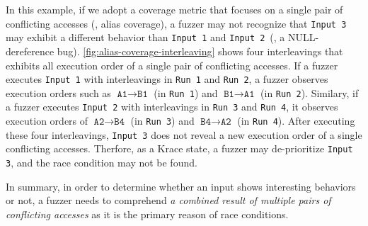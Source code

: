 In this example, if we adopt a coverage metric that focuses on a
single pair of conflicting accesses (\eg, alias coverage), a fuzzer
may not recognize that \texttt{Input 3} may exhibit a different
behavior than \texttt{Input 1} and \texttt{Input 2}~(\ie, a
NULL-dereference bug).
%
\autoref{fig:alias-coverage-interleaving} shows four interleavings
that exhibits all execution order of a single pair of conflicting
accesses. If a fuzzer executes \texttt{Input 1} with interleavings in
\texttt{Run 1} and \texttt{Run 2}, a fuzzer observes execution orders
such as $\texttt{A1} \rightarrow \texttt{B1}$ (in \texttt{Run 1}) and
$\texttt{B1} \rightarrow \texttt{A1}$ (in \texttt{Run 2}).
%
Similary, if a fuzzer executes \texttt{Input 2} with interleavings in
\texttt{Run 3} and \texttt{Run 4}, it observes execution orders of
$\texttt{A2} \rightarrow \texttt{B4}$ (in \texttt{Run 3}) and
$\texttt{B4} \rightarrow \texttt{A2}$ (in \texttt{Run 4}).
%
After executing these four interleavings, \texttt{Input 3} does not
reveal a new execution order of a single conflicting
accesses. Therfore, as a Krace state, a fuzzer may de-prioritize
\texttt{Input 3}, and the race condition may not be found.

In summary, in order to determine whether an input shows interesting
behaviors or not, a fuzzer needs to comprehend \textit{a combined
  result of multiple pairs of conflicting accesses} as it is the
primary reason of race conditions.





